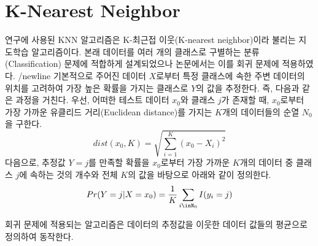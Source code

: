\documentclass{article}
\begin{document}
\section{K-Nearest Neighbor}
연구에 사용된 KNN 알고리즘은 K-최근접 이웃(K-nearest neighbor)이라 불리는 지도학습 알고리즘이다. 본래 데이터를 여러 개의 클래스로 구별하는 분류(Classification) 문제에 적합하게 설계되었으나 논문에서는 이를 회귀 문제에 적용하였다. /newline
기본적으로 주어진 데이터 $X$로부터 특정 클래스에 속한 주변 데이터의 위치를 고려하여 가장 높은 확률을 가지는 클래스로 $Y$의 값을 추정한다. 즉, 다음과 같은 과정을 거친다. 우선, 어떠한 테스트 데이터 $x_0$와 클래스 $j$가 존재할 때, $x_0$로부터 가장 가까운 유클리드 거리(Euclidean distance)를 가지는 $K$개의 데이터들의 순열 $N_0$을 구한다.
\begin{equation}
dist(x_0, K)=\sqrt{\sum_{i=1}^{K}(x_0-X_i)^2}
\end{equation}
다음으로, 추정값 $Y=j$를 만족할 확률을 $x_0$로부터 가장 가까운 $K$개의 데이터 중 클래스 $j$에 속하는 것의 개수와 전체 $K$의 값을 바탕으로 아래와 같이 정의한다.
\begin{equation}
Pr(Y=j | X=x_0)=\frac{1}{K}\sum_{i\inN_0}I(y_i=j)
\end{equation}

회귀 문제에 적용되는 알고리즘은 데이터의 추정값을 이웃한 데이터 값들의 평균으로 정의하여 동작한다.
\end{document}
